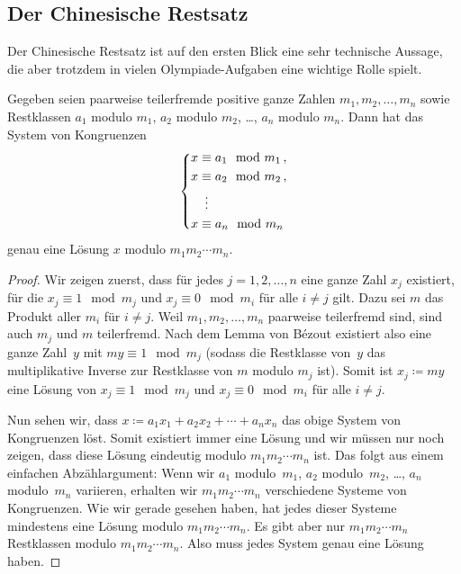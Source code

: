 \subsection*{Der Chinesische Restsatz}
Der Chinesische Restsatz ist auf den ersten Blick eine sehr technische Aussage, die aber trotzdem in vielen Olympiade-Aufgaben eine wichtige Rolle spielt.
\begin{satzmitnamen}
	Gegeben seien paarweise teilerfremde positive ganze Zahlen $m_1,m_2,\dotsc,m_n$ sowie Restklassen $a_1$ modulo $m_1$, $a_2$ modulo $m_2$, \ldots, $a_n$ modulo $m_n$. Dann hat das System von Kongruenzen
	\begin{equation*}
		\left\{\begin{aligned}
			x&\equiv a_1\mod m_1\,,\\
			x&\equiv a_2\mod m_2\,,\\
			&\mathrel{\tikz[inner sep=0,outer sep=0]{\node at (0,-0.5ex) {$\phantom{\equiv}$};\node at (0,0) {$\vdots$};}}\\
			x&\equiv a_n\mod m_n
		\end{aligned}\right.
	\end{equation*}
	genau eine Lösung $x$ modulo $m_1m_2\dotsm m_n$.
\end{satzmitnamen}
\begin{proof}
	Wir zeigen zuerst, dass für jedes $j=1,2,\dotsc,n$ eine ganze Zahl $x_j$ existiert, für die $x_j\equiv 1\mod m_j$ und $x_j\equiv 0\mod m_i$ für alle $i\neq j$ gilt. Dazu sei $m$ das Produkt aller $m_i$ für $i\neq j$. Weil $m_1,m_2,\dotsc,m_n$ paarweise teilerfremd sind, sind auch $m_j$ und $m$ teilerfremd. Nach dem Lemma von Bézout existiert also eine ganze Zahl~$y$ mit $my\equiv 1\mod m_j$ (sodass die Restklasse von~$y$ das multiplikative Inverse zur Restklasse von $m$ modulo $m_j$ ist). Somit ist $x_j\coloneqq my$ eine Lösung von $x_j\equiv 1\mod m_j$ und $x_j\equiv 0\mod m_i$ für alle $i\neq j$.
	
	Nun sehen wir, dass $x\coloneqq a_1x_1+a_2x_2+\dotsb+a_nx_n$ das obige System von Kongruenzen löst. Somit existiert immer eine Lösung und wir müssen nur noch zeigen, dass diese Lösung eindeutig modulo $m_1m_2\dotsm m_n$ ist. Das folgt aus einem einfachen Abzählargument: Wenn wir $a_1$ modulo~$m_1$, $a_2$ modulo~$m_2$, \ldots, $a_n$ modulo~$m_n$ variieren, erhalten wir $m_1m_2\dotsm m_n$ verschiedene Systeme von Kongruenzen. Wie wir gerade gesehen haben, hat jedes dieser Systeme mindestens eine Lösung modulo $m_1m_2\dotsm m_n$. Es gibt aber nur $m_1m_2\dotsm m_n$ Restklassen modulo $m_1m_2\dotsm m_n$. Also muss jedes System genau eine Lösung haben.
\end{proof}


